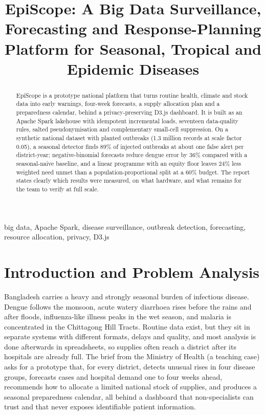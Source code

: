\documentclass[conference]{IEEEtran}
\begin{document}
\title{EpiScope: A Big Data Surveillance, Forecasting and Response-Planning Platform for Seasonal, Tropical and Epidemic Diseases}
\author{
}
\maketitle
\begin{abstract}
EpiScope is a prototype national platform that turns routine health, climate and stock data into early warnings, four-week forecasts, a supply allocation plan and a preparedness calendar, behind a privacy-preserving D3.js dashboard. It is built as an Apache Spark lakehouse with idempotent incremental loads, seventeen data-quality rules, salted pseudonymisation and complementary small-cell suppression. On a synthetic national dataset with planted outbreaks (1.3 million records at scale factor 0.05), a seasonal detector finds 89\% of injected outbreaks at about one false alert per district-year; negative-binomial forecasts reduce dengue error by 36\% compared with a seasonal-naive baseline, and a linear programme with an equity floor leaves 24\% less weighted need unmet than a population-proportional split at a 60\% budget. The report states clearly which results were measured, on what hardware, and what remains for the team to verify at full scale.
\end{abstract}
\begin{IEEEkeywords}
big data, Apache Spark, disease surveillance, outbreak detection, forecasting, resource allocation, privacy, D3.js
\end{IEEEkeywords}
\section{Introduction and Problem Analysis}
Bangladesh carries a heavy and strongly seasonal burden of infectious disease. Dengue follows the monsoon, acute watery diarrhoea rises before the rains and after floods, influenza-like illness peaks in the wet season, and malaria is concentrated in the Chittagong Hill Tracts. Routine data exist, but they sit in separate systems with different formats, delays and quality, and most analysis is done afterwards in spreadsheets, so supplies often reach a district after its hospitals are already full. The brief from the Ministry of Health (a teaching case) asks for a prototype that, for every district, detects unusual rises in four disease groups, forecasts cases and hospital demand one to four weeks ahead, recommends how to allocate a limited national stock of supplies, and produces a seasonal preparedness calendar, all behind a dashboard that non-specialists can trust and that never exposes identifiable patient information.
\end{document}

